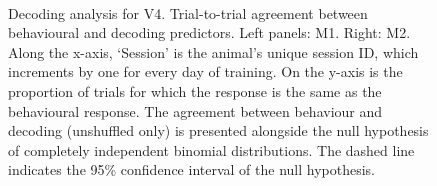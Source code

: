\begin{figure}[htbp]
    ~~
    \caption{%
    Decoding analysis for \ac{V4}.
    Trial-to-trial agreement between behavioural and decoding predictors.
    Left panels: \ac{M1}. Right: \ac{M2}.
	Along the x-axis, `Session' is the animal's unique session ID, which increments by one for every day of training.
    On the y-axis is the proportion of trials for which the response is the same as the behavioural response.
    The agreement between behaviour and decoding (unshuffled only) is presented alongside the null hypothesis of completely independent binomial distributions.
    The dashed line indicates the 95\% confidence interval of the null hypothesis.
}
    \label{fig:decag_all_v4}
\end{figure}

